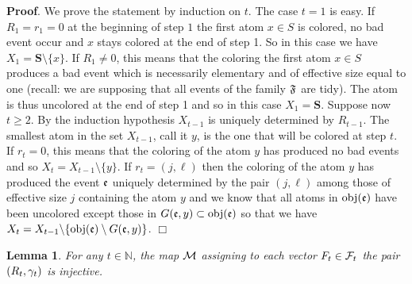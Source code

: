 \documentclass[11pt]{article}
\newtheorem{lem}[theo]{Lemma}
\let\\=\noindent
\begin{document}
\\\textbf{Proof}. We prove the statement by induction on $t$.
The case  $t=1$ is easy.  If $R_1=r_1=0$  at the beginning of step $1$ the first atom $x\in S$  is colored,
no bad event occur  and $x$ stays colored at the end of step 1. So in this case we have
$X_1=\mathbf{S}\setminus\{x\}$.
If $R_1\neq 0$, this means that the coloring the first atom $x\in S$ produces
a bad event which is necessarily  elementary and of effective size equal to one (recall: we are supposing that all events of the family
${\mathfrak{F}}$ are tidy). The atom  is thus uncolored at the end of step 1
and so in this case $X_1=\mathbf{S}$.
Suppose now $t \ge 2$. By the induction hypothesis $X_{t-1}$ is uniquely determined by $R_{t-1}$. The smallest atom in the set
$X_{t-1}$,  call it $y$,  is the one that will be colored at step $t$.
If $r_t=0$, this means that the coloring  of the  atom $y$  has produced no bad events and so
$X_t=X_{t-1} \setminus \{y\}$. If $r_t=(j, \ell)$ then  the coloring  of the  atom $y$ has produced
the event ${\mathfrak{e}}$  uniquely determined by the pair $ (j, \ell)$ among those
of effective size $j$ containing the atom $y$
and we know that all atoms in ${\rm obj}({\mathfrak{e}})$ have been uncolored except those in $G({\mathfrak{e}},y)\subset {\rm obj}({\mathfrak{e}})$ so that
we have $X_t=X_{t-1} \backslash \{{\rm obj}({\mathfrak{e}})\setminus G({\mathfrak{e}},y)\}$. $\Box$


\begin{lem}\label{lema 2} For any $t\in \mathbb{N}$,
the map $\cal M$ assigning to each vector  $F_t\in {\cal F}_t$  the pair $(R_t, \gamma_t)$ is injective.
\end{lem}
\end{document}
